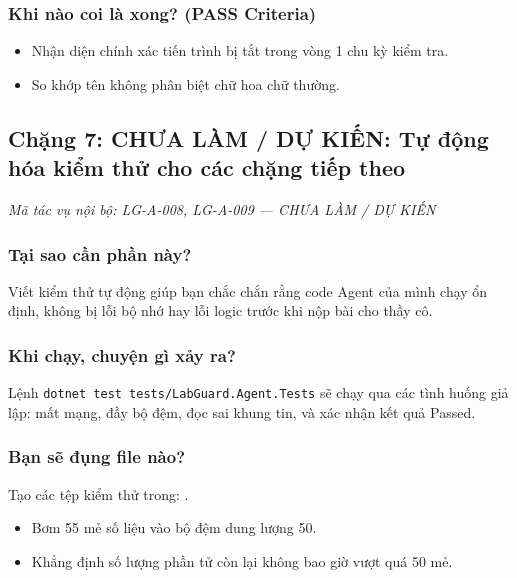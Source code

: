 \documentclass[12pt,a4paper]{article}
\begin{document}
\subsubsection{Khi nào coi là xong? (PASS Criteria)}
\begin{itemize}
  \item Nhận diện chính xác tiến trình bị tắt trong vòng 1 chu kỳ kiểm tra.
  \item So khớp tên không phân biệt chữ hoa chữ thường.
\end{itemize}

\subsection{Chặng 7: CHƯA LÀM / DỰ KIẾN: Tự động hóa kiểm thử cho các chặng tiếp theo}
{\footnotesize\color{lgGray}\textit{Mã tác vụ nội bộ: LG-A-008, LG-A-009 — CHƯA LÀM / DỰ KIẾN}}\par
\vspace{2mm}

\subsubsection{Tại sao cần phần này?}
Viết kiểm thử tự động giúp bạn chắc chắn rằng code Agent của mình chạy ổn định, không bị lỗi bộ nhớ hay lỗi logic trước khi nộp bài cho thầy cô.

\subsubsection{Khi chạy, chuyện gì xảy ra?}
Lệnh \texttt{dotnet test tests/LabGuard.Agent.Tests} sẽ chạy qua các tình huống giả lập: mất mạng, đầy bộ đệm, đọc sai khung tin, và xác nhận kết quả Passed.

\subsubsection{Bạn sẽ đụng file nào?}
Tạo các tệp kiểm thử trong: .

\begin{orientationbox}
\begin{itemize}[leftmargin=1.5em, itemsep=1pt]
  \item Bơm 55 mẻ số liệu vào bộ đệm dung lượng 50.
  \item Khẳng định số lượng phần tử còn lại không bao giờ vượt quá 50 mẻ.
\end{itemize}
\end{orientationbox}
\end{document}
